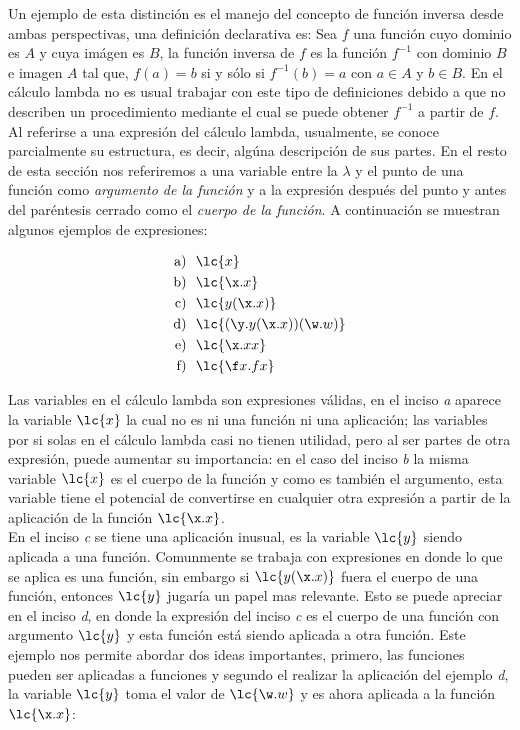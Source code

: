 Un ejemplo de esta distinción es el manejo del concepto de función inversa desde
ambas perspectivas, una definición declarativa es: Sea \(f\) una función cuyo
dominio es \(A\) y cuya imágen es \(B\), la función inversa de \(f\) es la
función \(f^{-1}\) con dominio \(B\) e imagen \(A\) tal que, \(f(a)=b\) si y
sólo si \(f^{-1}(b)=a\) con \(a\in A\) y \(b\in B\). En el cálculo lambda no es
usual trabajar con este tipo de definiciones debido a que no describen un
procedimiento mediante el cual se puede obtener \(f^{-1}\) a partir de \(f\).\\

Al referirse a una expresión del cálculo lambda, usualmente, se conoce
parcialmente su estructura, es decir, algúna descripción de sus partes. En el
resto de esta sección nos referiremos a una variable entre la \(\lambda\) y el
punto de una función como \emph{argumento de la función} y a la expresión
después del punto y antes del paréntesis cerrado como el \emph{cuerpo de la
función}. A continuación se muestran algunos ejemplos de expresiones:

\begin{align*}
  \text{a) }\ &\lc{x}\\ 
  \text{b) }\ &\lc{\x.x}\\
  \text{c) }\ &\lc{y (\x.x)}\\
  \text{d) }\ &\lc{(\y.y(\x.x))(\w.w)}\\
  \text{e) }\ &\lc{\x.x x}\\
  \text{f) }\ &\lc{\f x.f x}\\
\end{align*}

Las variables en el cálculo lambda son expresiones válidas, en el inciso
\emph{a} aparece la variable \(\lc{x}\) la cual no es ni una función ni una
aplicación; las variables por si solas en el cálculo lambda casi no tienen
utilidad, pero al ser partes de otra expresión, puede aumentar su importancia:
en el caso del inciso \emph{b} la misma variable \(\lc{x}\) es el cuerpo de la
función y como es también el argumento, esta variable tiene el potencial de
convertirse en cualquier otra expresión a partir de la aplicación de la función
\(\lc{\x.x}\).\\

En el inciso \emph{c} se tiene una aplicación inusual, es la variable \(\lc{y}\)
siendo aplicada a una función. Comunmente se trabaja con expresiones en donde lo
que se aplica es una función, sin embargo si \(\lc{y (\x.x)}\) fuera el cuerpo
de una función, entonces \(\lc{y}\) jugaría un papel mas relevante. Esto se
puede apreciar en el inciso \emph{d}, en donde la expresión del inciso \emph{c}
es el cuerpo de una función con argumento \(\lc{y}\) y esta función está siendo
aplicada a otra función. Este ejemplo nos permite abordar dos ideas importantes,
primero, las funciones pueden ser aplicadas a funciones y segundo el realizar la
aplicación del ejemplo \emph{d}, la variable \(\lc{y}\) toma el valor de
\(\lc{\w.w}\) y es ahora aplicada a la función \(\lc{\x.x}\):

